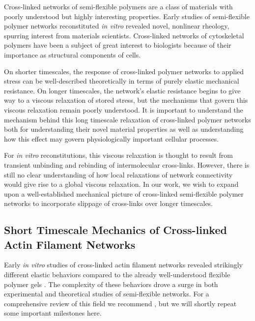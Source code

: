 \documentclass[pre,preprint]{revtex4-1}
\begin{document}
Cross-linked networks of semi-flexible polymers are a class of materials with poorly understood but highly interesting properties.    Early studies of semi-flexible polymer networks reconstituted {\em in vitro} revealed novel, nonlinear rheology, spurring interest from materials scientists\cite{megareview}.  Cross-linked networks of cytoskeletal polymers have been a subject of great interest to biologists  because of their importance as structural components of cells\cite{cellmech_review1,cellmech_review2}.


On shorter timescales, the response of cross-linked polymer networks to applied stress can be well-described theoretically in terms of purely elastic mechanical resistance.  On longer timescales, the network's elastic resistance begins to give way to a viscous relaxation of stored stress, but the mechanisms that govern this viscous relaxation remain poorly understood.   It is important to understand the mechanism behind this long timescale relaxation of cross-linked polymer networks both for understanding their novel material properties as well as understanding how this effect may govern physiologically important cellular processes\cite{cell_rheo}.


For {\em in vitro} reconstitutions, this viscous relaxation is thought to result from transient unbinding and rebinding of intermolecular cross-links\cite{rheo_crosslinksmatter,theo_crosslinkslip1}. However, there is still no clear understanding of how local relaxations of network connectivity would give rise to a global viscous relaxation.  In our work, we wish to expand upon a well-established mechanical picture of cross-linked semi-flexible polymer networks to incorporate slippage of cross-links over longer timescales.  



\subsection{Short Timescale Mechanics of Cross-linked Actin Filament Networks}


Early {\em in vitro}  studies of cross-linked actin filament networks revealed strikingly different elastic behaviors compared to the already well-understood flexible polymer gels \cite{rheo_bench}.  The complexity of these behaviors drove a surge in both experimental and theoretical studies of semi-flexible networks.  For a comprehensive review of this field we recommend \cite{megareview}, but we will shortly repeat some important milestones here.
\end{document}
